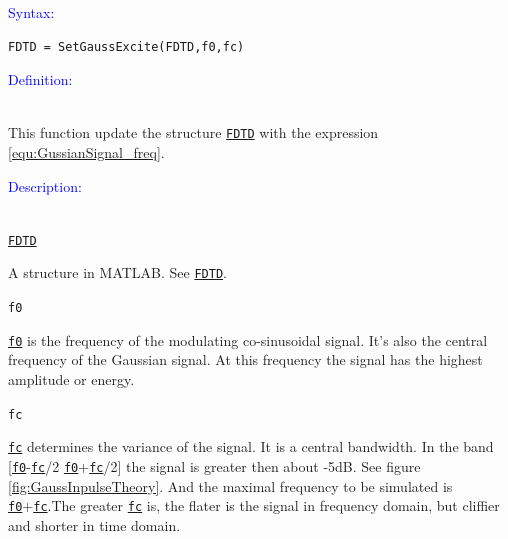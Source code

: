 \textcolor{blue}{\begin{large}Syntax:\end{large}}
 \begin{lstlisting}
FDTD = SetGaussExcite(FDTD,f0,fc)
 \end{lstlisting}

\textcolor{blue}{\begin{large}Definition:\end{large}}\\
      This function update the structure \hyperref[para:FDTD]{\texttt{FDTD}} with the expression \ref{equ:GussianSignal_freq}. 

\textcolor{blue}{\begin{large}Description:\end{large}}\\
	\hyperref[para:FDTD]{\texttt{FDTD}} 
	    \begin{myindentpar}
		A structure in MATLAB. See \hyperref[para:FDTD]{\texttt{FDTD}}.
	    \end{myindentpar}
	\texttt{f0}   \label{para:f0} %
	    \begin{myindentpar}
		\hyperref[para:f0]{\texttt{f0}}  is the frequency of the modulating co-sinusoidal signal. It's also the central frequency of the Gaussian signal. At this frequency the signal has the highest amplitude or energy. 
	    \end{myindentpar}
	\texttt{fc}   \label{para:fc} %
	    \begin{myindentpar}
		\hyperref[para:fc]{\texttt{fc}} determines the variance of the signal. It is a central bandwidth. In the band [\hyperref[para:f0]{\texttt{f0}}-\hyperref[para:fc]{\texttt{fc}}/2 \quad \hyperref[para:f0]{\texttt{f0}}+\hyperref[para:fc]{\texttt{fc}}/2] the signal is greater then about -5dB. See figure \ref{fig:GaussInpulseTheory}. And the maximal frequency to be simulated is \hyperref[para:f0]{\texttt{f0}}+\hyperref[para:fc]{\texttt{fc}}.The greater \hyperref[para:fc]{\texttt{fc}} is, the flater is the signal in frequency domain, but cliffier and shorter in time domain.
	    \end{myindentpar}


